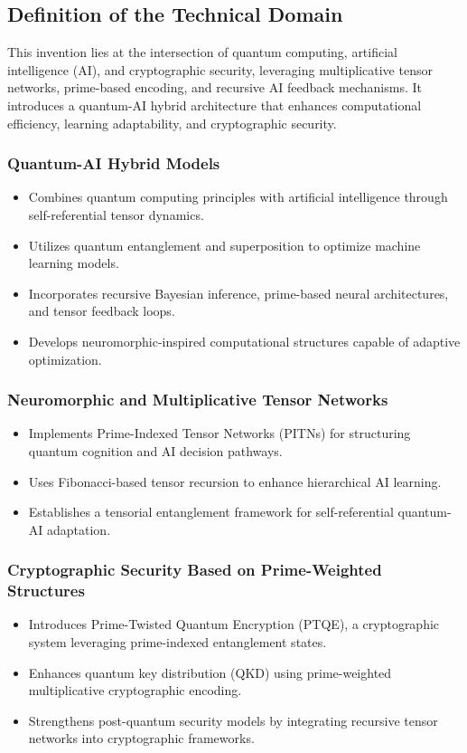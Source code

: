 \documentclass{article}
\theoremstyle{plain}
\begin{document}
\subsection{Definition of the Technical Domain}
This invention lies at the intersection of quantum computing, artificial intelligence (AI), and cryptographic security, leveraging multiplicative tensor networks, prime-based encoding, and recursive AI feedback mechanisms. It introduces a quantum-AI hybrid architecture that enhances computational efficiency, learning adaptability, and cryptographic security.

\subsubsection{Quantum-AI Hybrid Models}
\begin{itemize}
    \item Combines quantum computing principles with artificial intelligence through self-referential tensor dynamics.
    \item Utilizes quantum entanglement and superposition to optimize machine learning models.
    \item Incorporates recursive Bayesian inference, prime-based neural architectures, and tensor feedback loops.
    \item Develops neuromorphic-inspired computational structures capable of adaptive optimization.
\end{itemize}

\subsubsection{Neuromorphic and Multiplicative Tensor Networks}
\begin{itemize}
    \item Implements Prime-Indexed Tensor Networks (PITNs) for structuring quantum cognition and AI decision pathways.
    \item Uses Fibonacci-based tensor recursion to enhance hierarchical AI learning.
    \item Establishes a tensorial entanglement framework for self-referential quantum-AI adaptation.
\end{itemize}

\subsubsection{Cryptographic Security Based on Prime-Weighted Structures}
\begin{itemize}
    \item Introduces Prime-Twisted Quantum Encryption (PTQE), a cryptographic system leveraging prime-indexed entanglement states.
    \item Enhances quantum key distribution (QKD) using prime-weighted multiplicative cryptographic encoding.
    \item Strengthens post-quantum security models by integrating recursive tensor networks into cryptographic frameworks.
\end{itemize}
\end{document}
